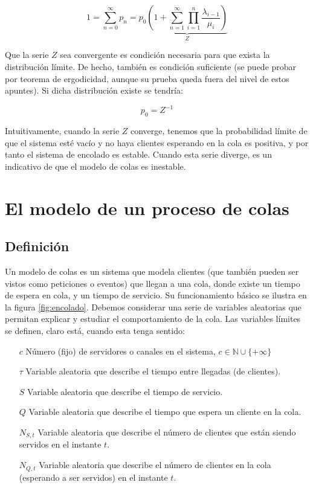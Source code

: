 \documentclass[a4paper,10pt]{scrartcl}
\theoremstyle{definition}
\theoremstyle{definition}
\numberwithin{equation}{section}
\begin{document}
	\begin{equation}
	1 = \sum_{n=0}^{\infty} p_n = p_0 \underbrace{\left(1 + \sum_{n=1}^{\infty} \prod_{i=1}^n \frac{\lambda_{i-1}}{\mu_i} \right)}_{Z}
	\label{eq:stabseries}
	\end{equation}
	
	Que la serie $Z$ sea convergente es condición necesaria para que exista la distribución límite. 
	De hecho, también es condición suficiente (se puede probar por teorema de ergodicidad, aunque su prueba queda
	fuera del nivel de estos apuntes). Si dicha distribución existe se tendría: 
	
	\begin{equation}
	p_0 = Z^{-1} 
	\label{eq:relp0}
	\end{equation}
	
	Intuitivamente, cuando la serie $Z$ converge, tenemos que la probabilidad límite de que el 
	sistema esté vacío y no haya clientes esperando en la cola es positiva, y por tanto el sistema 
	de encolado es estable. Cuando esta serie diverge, es un indicativo de que el modelo de colas
	es inestable.
	
	
	\section{El modelo de un proceso de colas}
	\subsection{Definición}
	Un modelo de colas es un sistema que modela clientes (que también pueden ser vistos como peticiones o eventos) que llegan a una cola,
	donde existe un tiempo de espera en cola, y un tiempo de servicio. Su funcionamiento básico se 
	ilustra en la figura \ref{fig:encolado}. Debemos considerar una serie de variables aleatorias que permitan
	explicar y estudiar el comportamiento de la cola. Las variables límites se definen, claro está, cuando esta 
	tenga sentido:
	
	\begin{itemize}
		\item [$c$]
		Número (fijo) de servidores o canales en el sistema, $c\in \mathbb{N} \cup \{+\infty\}$
		\item [$\tau$]
		Variable aleatoria que describe el tiempo entre llegadas (de clientes).
		\item [$S$]
		Variable aleatoria que describe el tiempo de servicio.
		\item [$Q$]
		Variable aleatoria que describe el tiempo que espera un cliente en la cola.
		\item [$N_{S,t}$]
		Variable aleatoria que describe el número de clientes que están siendo servidos en el instante $t$.
		\item [$N_{Q,t}$]
		Variable aleatoria que describe el número de clientes en la cola (esperando a ser servidos) en el instante $t$.
	\end{itemize}
	
\end{document}
